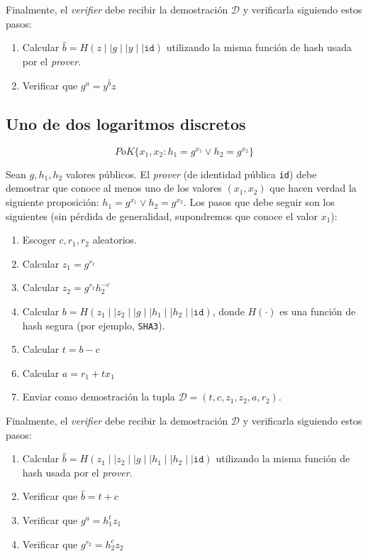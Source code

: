 Finalmente, el \emph{verifier} debe recibir la demostración $\mathcal{D}$ y verificarla siguiendo estos pasos:
\begin{enumerate}
	\item Calcular $\hat{b} = H(z \mid\mid g \mid\mid y \mid\mid \mathtt{id})$ utilizando la misma función de hash usada por el \emph{prover}.
	\item Verificar que $g^a = y^{\hat{b}} z$
\end{enumerate} 

\subsection{Uno de dos logaritmos discretos}

$$PoK\{x_1, x_2 : h_1 = g^{x_1} \lor h_2 = g^{x_2}\}$$

Sean $g,h_1,h_2$ valores públicos. El \emph{prover} (de identidad pública \texttt{id}) debe demostrar que conoce al menos uno de los valores $(x_1,x_2)$ que hacen verdad la siguiente proposición: $h_1 = g^{x_1} \lor h_2 = g^{x_2}$. Los pasos que debe seguir son los siguientes (sin pérdida de generalidad, supondremos que conoce el valor $x_1$):
\begin{enumerate}
	\item Escoger $c, r_1, r_2$ aleatorios.
	\item Calcular $z_1 = g^{r_1}$
	\item Calcular $z_2 = g^{r_2} h_2^{-c}$
	\item Calcular $b = H(z_1 \mid\mid z_2 \mid\mid g \mid\mid h_1 \mid\mid h_2 \mid\mid \mathtt{id})$, donde $H(\cdot)$ es una función de hash segura (por ejemplo, \texttt{SHA3}).
	\item Calcular $t = b - c$
	\item Calcular $a = r_1 + t x_1$
	\item Enviar como demostración la tupla $\mathcal{D} = (t, c, z_1, z_2, a, r_2)$.
\end{enumerate}

Finalmente, el \emph{verifier} debe recibir la demostración $\mathcal{D}$ y verificarla siguiendo estos pasos:
\begin{enumerate}
	\item Calcular $\hat{b} = H(z_1 \mid\mid z_2 \mid\mid g \mid\mid h_1 \mid\mid h_2 \mid\mid \mathtt{id})$ utilizando la misma función de hash usada por el \emph{prover}.
	\item Verificar que $\hat{b} = t + c$
	\item Verificar que $g^a = h_1^t z_1$
	\item Verificar que $g^{r_2} = h_2^c z_2$
\end{enumerate} 

